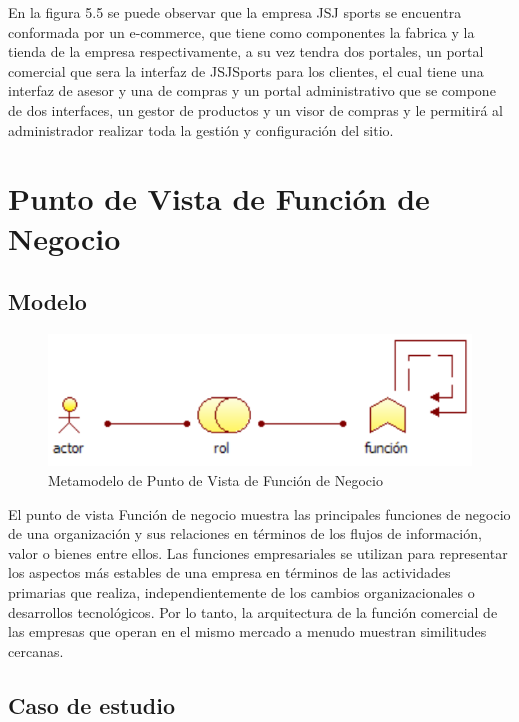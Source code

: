 En la figura 5.5 se puede observar que la empresa JSJ sports se encuentra conformada por un e-commerce, que tiene como componentes la fabrica y la tienda de la empresa respectivamente, a su vez tendra dos portales, un portal comercial que sera la interfaz de JSJSports para los clientes, el cual tiene una interfaz de asesor y una de compras y un portal administrativo que se compone de dos interfaces, un gestor de productos y un visor de compras y le permitirá al administrador realizar toda la gestión y configuración del sitio.

\newpage

\section{Punto de Vista de Función de Negocio}

\subsection{Modelo}
\begin{figure}[th!]
	\centering
	\includegraphics[width=0.5\linewidth]{arquitectura/imagenes/modeloFuncionNegocio}
	\caption{Metamodelo de Punto de Vista de Función de Negocio \cite{pun3}}
	\label{fig:metamodelo de punto de vista de función de negocio}
\end{figure}
El punto de vista Función de negocio muestra las principales funciones de negocio de una organización y sus relaciones en términos de los flujos de información, valor o bienes entre ellos. Las funciones empresariales se utilizan para representar los aspectos más estables de una empresa en términos de las actividades primarias que realiza, independientemente de los cambios organizacionales o desarrollos tecnológicos. Por lo tanto, la arquitectura de la función comercial de las empresas que operan en el mismo mercado a menudo muestran similitudes cercanas.


\subsection{Caso de estudio}

